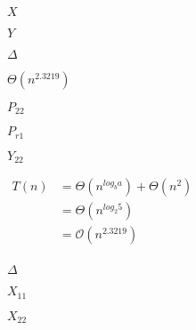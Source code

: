 \documentclass[10pt]{book}
\begin{document}
\begin{mdSnippets}
\begin{mdInlineSnippet}[02129bb861061d1a052c592e2dc6b383]%
$X$\end{mdInlineSnippet}%
\begin{mdInlineSnippet}[57cec4137b614c87cb4e24a3d003a3e0]%
$Y$\end{mdInlineSnippet}%
\begin{mdInlineSnippet}[967878d1da852d4b07a961e3168b0fff]%
$\Delta$\end{mdInlineSnippet}%
\begin{mdInlineSnippet}[0a6562d5d275b21df6a9d5c450cab56d]%
$\Theta(n^{2.3219})$\end{mdInlineSnippet}%
\begin{mdInlineSnippet}[611c6285de0523c975b9439b0d5a8760]%
$P_{22}$\end{mdInlineSnippet}%
\begin{mdInlineSnippet}[ca9b20d131dabc52fd6f2b4ef8dc7304]%
$P_{r1}$\end{mdInlineSnippet}%
\begin{mdInlineSnippet}[3165313348ba27e1079960bff02d2249]%
$Y_{22}$\end{mdInlineSnippet}%
\begin{mdInlineSnippet}[865735bd90c5811b51bb546541a03ea2]%
$\begin{aligned}T(n) &= \Theta(n^{log_{b} a}) + \Theta(n^{2})\\   &= \Theta(n^{log_{2} 5})\\ &= \mathcal{O}{(n^{2.3219})}\\\end{aligned} $\end{mdInlineSnippet}%
\begin{mdInlineSnippet}[967878d1da852d4b07a961e3168b0fff]%
$\Delta$\end{mdInlineSnippet}%
\begin{mdInlineSnippet}[f4355dec5043654402112f23313a042f]%
$X_{11}$\end{mdInlineSnippet}%
\begin{mdInlineSnippet}[6251022e6652340cba75729f50fe6b30]%
$X_{22}$\end{mdInlineSnippet}%
\begin{mdInlineSnippet}[967878d1da852d4b07a961e3168b0fff]%

\end{mdInlineSnippet}
\end{mdSnippets}
\end{document}
